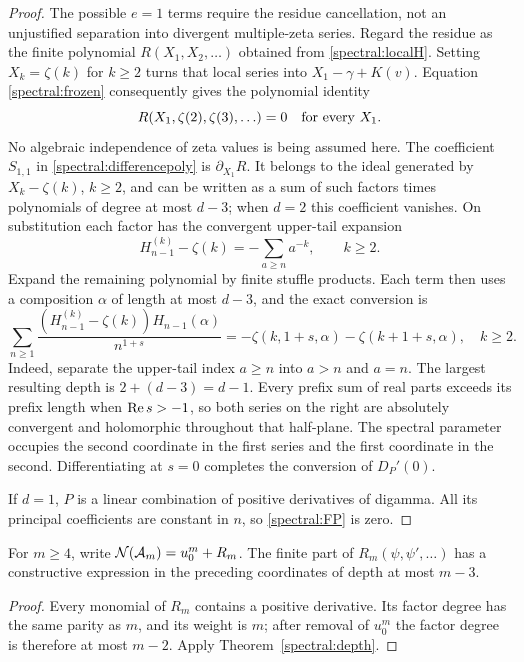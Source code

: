\begin{proof}
The possible $e=1$ terms require the residue cancellation, not an
unjustified separation into divergent multiple-zeta series.  Regard the
residue as the finite polynomial $R(X_1,X_2,\ldots)$ obtained from
\eqref{spectral:localH}.  Setting $X_k=\zeta(k)$ for $k\geq2$ turns that
local series into $X_1-\gamma+K(v)$.  Equation
\eqref{spectral:frozen} consequently gives the polynomial identity
\[
 R(X_1,\zeta(2),\zeta(3),\ldots)=0
 \quad\hbox{for every }X_1.
\]
No algebraic independence of zeta values is being assumed here.
The coefficient $S_{1,1}$ in \eqref{spectral:differencepoly} is
$\partial_{X_1}R$.  It belongs to the ideal generated by
$X_k-\zeta(k)$, $k\geq2$, and can be written as a sum of such factors
times polynomials of degree at most $d-3$; when $d=2$ this coefficient
vanishes.  On substitution each factor
has the convergent upper-tail expansion
\[
 H_{n-1}^{(k)}-\zeta(k)=-\sum_{a\geq n}a^{-k},\qquad k\geq2.
\]
Expand the remaining polynomial by finite stuffle products.  Each term
then uses a composition $\alpha$ of length at most $d-3$, and the exact
conversion is
\begin{equation}\label{spectral:tailconversion}
 \boxed{\displaystyle
 \sum_{n\geq1}\frac{(H_{n-1}^{(k)}-\zeta(k))H_{n-1}(\alpha)}{n^{1+s}}
     =-\zeta(k,1+s,\alpha)-\zeta(k+1+s,\alpha),\quad k\geq2.}
\end{equation}
Indeed, separate the upper-tail index $a\geq n$ into $a>n$ and $a=n$.
The largest resulting depth is $2+(d-3)=d-1$.  Every prefix sum of
real parts exceeds its prefix length when $\operatorname{Re} s>-1$, so both series
on the right are absolutely convergent and holomorphic throughout that
half-plane.  The spectral parameter occupies the second coordinate in
the first series and the first coordinate in the second.  Differentiating
at $s=0$ completes the conversion of $D_P'(0)$.

If $d=1$, $P$ is a linear combination of positive derivatives of
digamma.  All its principal coefficients are constant in $n$, so
\eqref{spectral:FP} is zero.
\end{proof}

\begin{corollary}
\label{spectral:Gammadepth}
For $m\geq4$, write $\mathcal N(\mathcal A_m)=u_0^m+R_m$.  The finite part of
$R_m(\psi,\psi',\ldots)$ has a constructive expression in the preceding
coordinates of depth at most $m-3$.
\end{corollary}

\begin{proof}
Every monomial of $R_m$ contains a positive derivative.  Its factor
degree has the same parity as $m$, and its weight is $m$; after removal
of $u_0^m$ the factor degree is therefore at most $m-2$.  Apply
Theorem~\ref{spectral:depth}.
\end{proof}

